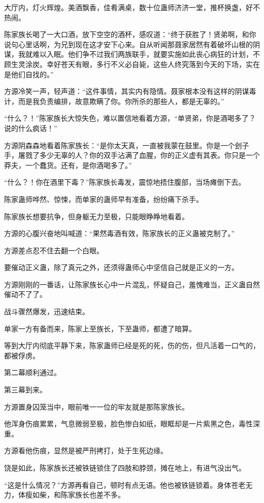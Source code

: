 \begin{this_body}
大厅内，灯火辉煌。美酒飘香，佳肴满桌，数十位蛊师济济一堂，推杯换盏，好不热闹。

陈家族长喝了一大口酒，放下空空的酒杯，感叹道：“终于获胜了！贤弟啊，和你说句心里话啊，为兄到现在这才安下心来。自从听闻那聂家居然有着破坏山根的阴谋，我就难以入眠。他们争不过我们两族联手，就要实施如此丧心病狂的计划，不顾生灵涂炭。幸好苍天有眼，多行不义必自毙，这些人终究落到今天的下场，实在是他们自找的。”

方源冷笑一声，轻声道：“这件事情，其实内有隐情。聂家根本没有这样的阴谋毒计，而是我负责编排，故意欺瞒了你。你所杀的那些人，都是无辜的。”

“什么？！”陈家族长大惊失色，难以置信地看着方源，“单贤弟，你是酒喝多了？说的什么疯话！”

方源阴森森地看着陈家族长：“是你太天真，一直被我蒙在鼓里。你是一个刽子手，屠戮了多少无辜的人？你的双手沾满了血腥，你的正义虚有其表。你只是一个莽夫，一个蠢货。还有，是你酒喝多了。”

“什么？！你在酒里下毒？”陈家族长毒发，震惊地捂住腹部，当场瘫倒下去。

陈家蛊师哗然、惊悚，而单家的蛊师早有准备，纷纷痛下杀手。

陈家族长想要抗争，但身躯无力至极，只能眼睁睁地看着。

方源的心腹兴奋地叫喊道：“果然毒酒有效，陈家族长的正义蛊被克制了。”

方源差点忍不住去翻一个白眼。

要催动正义蛊，除了真元之外，还须得蛊师心中坚信自己就是正义的一方。

方源刚刚的一番话，让陈家族长心中一片混乱，怀疑自己，羞愧难当，正义蛊自然催动不了了。

战斗骤然爆发，迅速结束。

单家一方有备而来，陈家上至族长，下至蛊师，都遭了暗算。

等到大厅内彻底平静下来，陈家蛊师已经是死的死，伤的伤，但凡活着一口气的，都被俘虏。

第二幕顺利通过。

第三幕到来。

方源置身囚笼当中，眼前唯一一位的牢友就是那陈家族长。

他浑身伤痕累累，气息微弱至极，脸色惨白如纸，眼眶却是一片紫黑之色，毒性深重。

方源看他伤痕，显然是被严刑拷打，处于生死边缘。

饶是如此，陈家族长还被铁链锁住了四肢和脖颈，摊在地上，有进气没出气。

“这是什么情况？”方源再看自己，顿时有点无语。他也被铁链锁着。身体苍老无力，体瘦如柴，和陈家族长也差不多。


\end{this_body}
